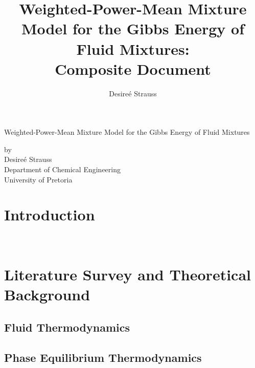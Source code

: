\documentclass[a4paperm,bezier,amstex]{report}
\author{Desire\'{e} Strauss}
\title{Weighted-Power-Mean Mixture Model for the Gibbs Energy of Fluid Mixtures:\\
Composite Document}
\numberwithin{equation}{section}
\numberwithin{figure}{section}
\begin{document}
\setlength{\parindent}{0pt}

\begin{titlepage}
\date{}
\begin{LARGE}
\maketitle
\thispagestyle{empty}
\end{LARGE}
\end{titlepage}


\thispagestyle{empty}
\begin{center}
\begin{Large}
\begin{LARGE}
 {Weighted-Power-Mean Mixture Model for the Gibbs Energy of Fluid Mixtures}\\
\end{LARGE}
\bigskip
by \\
Desire\'{e} Strauss\\
\bigskip 
Department of Chemical Engineering\\
University of Pretoria
\end{Large}
\end{center}
\pagebreak

\thispagestyle{empty}
\tableofcontents
\pagebreak


	\chapter*{Introduction}\
		
	
	\pagebreak	
	\printnomenclature%
	\pagebreak
	
	\chapter{Literature Survey and Theoretical Background}
		\section{Fluid Thermodynamics}
		
		
	
		\section{Phase Equilibrium Thermodynamics}
		
	
\end{document}
